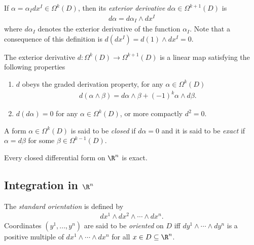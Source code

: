 \documentclass{article}
\begin{document}
\begin{definition}
    If $\alpha=\alpha_Idx^I\in\Omega^k(D)$, then its \emph{exterior derivative} $d\alpha\in\Omega^{k+1}(D)$
    is 
    \begin{align*}
        d\alpha = d\alpha_I \wedge dx^I
    \end{align*}
    where $d\alpha_I$ denotes the exterior derivative of the function $\alpha_I$. Note that 
    a consequence of this definition is $d(dx^I) = d(1)\wedge dx^I=0$.
\end{definition}

\begin{theorem}
    The exterior derivative $d:\Omega^k(D)\to \Omega^{k+1}(D)$ is a linear map satisfying
    the following properties 
    \begin{enumerate}
        \item $d$ obeys the graded derivation property, for any $\alpha\in\Omega^k(D)$ \begin{align*}
            d(\alpha \wedge \beta) = d\alpha\wedge\beta +(-1)^k\alpha\wedge d\beta.
        \end{align*}
        \item $d(d\alpha)=0$ for any $\alpha\in\Omega^k(D)$, or more compactly $d^2=0$.
    \end{enumerate}
\end{theorem}

\begin{definition}
    A form $\alpha\in\Omega^k(D)$ is said to be \emph{closed} if $d\alpha = 0$ and it is said
    to be \emph{exact} if $\alpha=d\beta$ for some $\beta\in\Omega^{k-1} (D)$.
\end{definition}

\begin{lemma}[Poincar\'e]
    Every closed differential form on $\R^n$ is exact.
\end{lemma}

\subsection{Integration in $\R^n$}

\begin{definition}
    The \emph{standard orientation} is defined by
    \begin{align*}
        dx^1\wedge dx^2 \wedge \cdots \wedge dx^n.
    \end{align*}
    Coordinates $(y^1, ..., y^n)$ are said to be \emph{oriented} on $D$ iff
    $dy^1\wedge\cdots\wedge dy^n$ is a positive multiple of $dx^1\wedge\cdots\wedge dx^n$
    for all $x\in D\subseteq \R^n$.
\end{definition}
\end{document}
